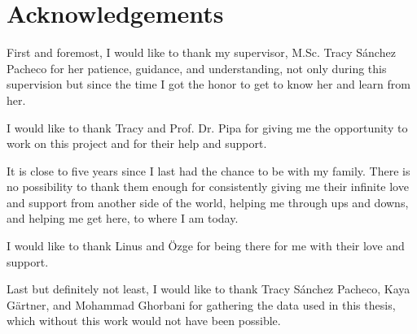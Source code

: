 \chapter*{Acknowledgements}\label{cha:acknowledgement}


First and foremost, I would like to thank my supervisor, M.Sc. Tracy Sánchez Pacheco for her patience, guidance, and understanding, not only during this supervision but since the time I got the honor to get to know her and learn from her.

I would like to thank Tracy and Prof. Dr. Pipa for giving me the opportunity to work on this project and for their help and support.

It is close to five years since I last had the chance to be with my family. There is no possibility to thank them enough for consistently giving me their infinite love and support from another side of the world, helping me through ups and downs, and helping me get here, to where I am today.

I would like to thank Linus and Özge for being there for me with their love and support.

Last but definitely not least, I would like to thank Tracy Sánchez Pacheco, Kaya Gärtner, and Mohammad Ghorbani for gathering the data used in this thesis, which without this work would not have been possible.